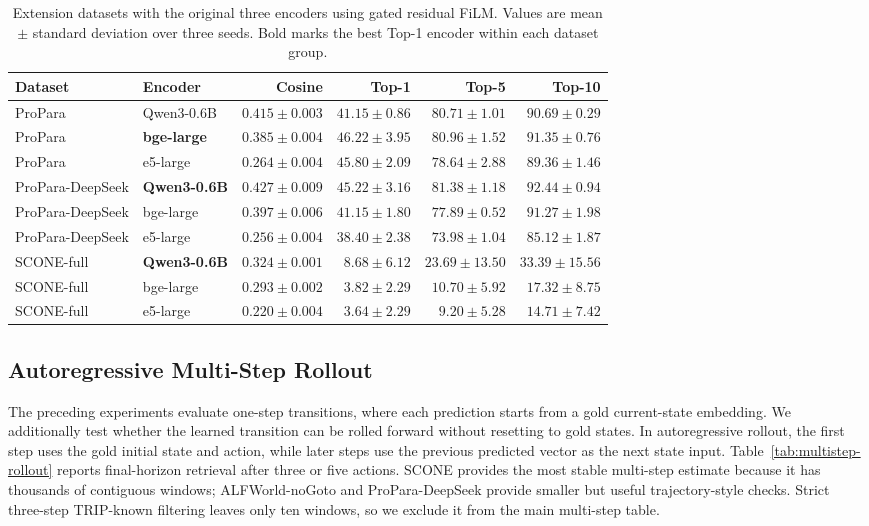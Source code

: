 \documentclass{article}
\begin{document}
\begin{table}[t]
  \centering
  \caption{Extension datasets with the original three encoders using gated residual FiLM. Values are mean $\pm$ standard deviation over three seeds. Bold marks the best Top-1 encoder within each dataset group.}
  \label{tab:extended-results}
  \tiny
  \setlength{\tabcolsep}{2pt}
  \begin{tabular}{llrrrr}
    \toprule
    Dataset & Encoder & Cosine & Top-1 & Top-5 & Top-10 \\
    \midrule
    ProPara & Qwen3-0.6B & $0.415{\pm}0.003$ & $41.15{\pm}0.86$ & $80.71{\pm}1.01$ & $90.69{\pm}0.29$ \\
    ProPara & \textbf{bge-large} & $0.385{\pm}0.004$ & $\mathbf{46.22{\pm}3.95}$ & $80.96{\pm}1.52$ & $91.35{\pm}0.76$ \\
    ProPara & e5-large & $0.264{\pm}0.004$ & $45.80{\pm}2.09$ & $78.64{\pm}2.88$ & $89.36{\pm}1.46$ \\
    \midrule
    ProPara-DeepSeek & \textbf{Qwen3-0.6B} & $0.427{\pm}0.009$ & $\mathbf{45.22{\pm}3.16}$ & $81.38{\pm}1.18$ & $92.44{\pm}0.94$ \\
    ProPara-DeepSeek & bge-large & $0.397{\pm}0.006$ & $41.15{\pm}1.80$ & $77.89{\pm}0.52$ & $91.27{\pm}1.98$ \\
    ProPara-DeepSeek & e5-large & $0.256{\pm}0.004$ & $38.40{\pm}2.38$ & $73.98{\pm}1.04$ & $85.12{\pm}1.87$ \\
    \midrule
    SCONE-full & \textbf{Qwen3-0.6B} & $0.324{\pm}0.001$ & $\mathbf{8.68{\pm}6.12}$ & $23.69{\pm}13.50$ & $33.39{\pm}15.56$ \\
    SCONE-full & bge-large & $0.293{\pm}0.002$ & $3.82{\pm}2.29$ & $10.70{\pm}5.92$ & $17.32{\pm}8.75$ \\
    SCONE-full & e5-large & $0.220{\pm}0.004$ & $3.64{\pm}2.29$ & $9.20{\pm}5.28$ & $14.71{\pm}7.42$ \\
    \bottomrule
  \end{tabular}
\end{table}

\subsection{Autoregressive Multi-Step Rollout}

The preceding experiments evaluate one-step transitions, where each prediction starts from a gold current-state embedding. We additionally test whether the learned transition can be rolled forward without resetting to gold states. In autoregressive rollout, the first step uses the gold initial state and action, while later steps use the previous predicted vector as the next state input. Table~\ref{tab:multistep-rollout} reports final-horizon retrieval after three or five actions. SCONE provides the most stable multi-step estimate because it has thousands of contiguous windows; ALFWorld-noGoto and ProPara-DeepSeek provide smaller but useful trajectory-style checks. Strict three-step TRIP-known filtering leaves only ten windows, so we exclude it from the main multi-step table.
\end{document}
